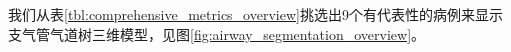 我们从表\ref{tbl:comprehensive_metrics_overview}挑选出9个有代表性的病例来显示支气管气道树三维模型，见图\ref{fig:airway_segmentation_overview}。

